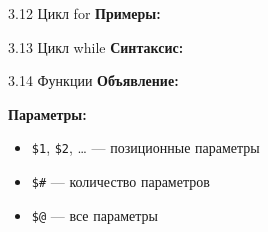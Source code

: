 \documentclass[
  ignorenonframetext,
  aspectratio=169,
  russian,
]{beamer}
\newenvironment{Shaded}{\begin{snugshade}}{\end{snugshade}}
\newcommand{\BuiltInTok}[1]{\textcolor[rgb]{0.00,0.23,0.31}{#1}}
\newcommand{\CommentTok}[1]{\textcolor[rgb]{0.37,0.37,0.37}{#1}}
\newcommand{\ControlFlowTok}[1]{\textcolor[rgb]{0.00,0.23,0.31}{\textbf{#1}}}
\newcommand{\DataTypeTok}[1]{\textcolor[rgb]{0.68,0.00,0.00}{#1}}
\newcommand{\DecValTok}[1]{\textcolor[rgb]{0.68,0.00,0.00}{#1}}
\newcommand{\ExtensionTok}[1]{\textcolor[rgb]{0.00,0.23,0.31}{#1}}
\newcommand{\FunctionTok}[1]{\textcolor[rgb]{0.28,0.35,0.67}{#1}}
\newcommand{\KeywordTok}[1]{\textcolor[rgb]{0.00,0.23,0.31}{\textbf{#1}}}
\newcommand{\NormalTok}[1]{\textcolor[rgb]{0.00,0.23,0.31}{#1}}
\newcommand{\OperatorTok}[1]{\textcolor[rgb]{0.37,0.37,0.37}{#1}}
\newcommand{\OtherTok}[1]{\textcolor[rgb]{0.00,0.23,0.31}{#1}}
\newcommand{\PreprocessorTok}[1]{\textcolor[rgb]{0.68,0.00,0.00}{#1}}
\newcommand{\StringTok}[1]{\textcolor[rgb]{0.13,0.47,0.30}{#1}}
\newcommand{\VariableTok}[1]{\textcolor[rgb]{0.07,0.07,0.07}{#1}}
\providecommand{\tightlist}{%
  \setlength{\itemsep}{0pt}\setlength{\parskip}{0pt}}
\begin{document}
\begin{frame}[fragile]{3.12 Цикл for}
\label{ux446ux438ux43aux43b-for}
\textbf{Примеры:}

\begin{Shaded}
\end{Shaded}
\end{frame}

\begin{frame}[fragile]{3.13 Цикл while}
\label{ux446ux438ux43aux43b-while}
\textbf{Синтаксис:}

\begin{Shaded}
\end{Shaded}
\end{frame}

\begin{frame}[fragile]{3.14 Функции}
\label{ux444ux443ux43dux43aux446ux438ux438}
\textbf{Объявление:}

\begin{Shaded}
\end{Shaded}

\textbf{Параметры:}

\begin{itemize}[<+->]
\tightlist
\item
  \texttt{\$1}, \texttt{\$2}, \ldots{} --- позиционные параметры
\item
  \texttt{\$\#} --- количество параметров
\item
  \texttt{\$@} --- все параметры
\end{itemize}
\end{frame}
\end{document}
